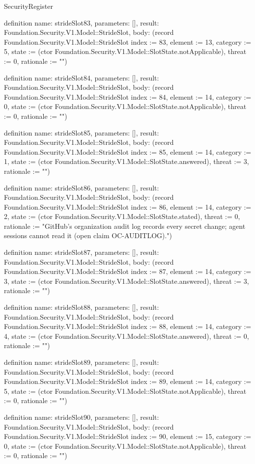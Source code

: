 \begin{lexlean}{SecurityRegister}
\begin{semanticmodule}
definition{
  name: strideSlot83,
  parameters: [],
  result: Foundation.Security.V1.Model::StrideSlot,
  body: (record Foundation.Security.V1.Model::StrideSlot {index := 83, element := 13, category := 5, state := (ctor Foundation.Security.V1.Model::SlotState.notApplicable), threat := 0, rationale := ""})
}

definition{
  name: strideSlot84,
  parameters: [],
  result: Foundation.Security.V1.Model::StrideSlot,
  body: (record Foundation.Security.V1.Model::StrideSlot {index := 84, element := 14, category := 0, state := (ctor Foundation.Security.V1.Model::SlotState.notApplicable), threat := 0, rationale := ""})
}

definition{
  name: strideSlot85,
  parameters: [],
  result: Foundation.Security.V1.Model::StrideSlot,
  body: (record Foundation.Security.V1.Model::StrideSlot {index := 85, element := 14, category := 1, state := (ctor Foundation.Security.V1.Model::SlotState.answered), threat := 3, rationale := ""})
}

definition{
  name: strideSlot86,
  parameters: [],
  result: Foundation.Security.V1.Model::StrideSlot,
  body: (record Foundation.Security.V1.Model::StrideSlot {index := 86, element := 14, category := 2, state := (ctor Foundation.Security.V1.Model::SlotState.stated), threat := 0, rationale := "GitHub's organization audit log records every secret change; agent sessions cannot read it (open claim OC-AUDITLOG)."})
}

definition{
  name: strideSlot87,
  parameters: [],
  result: Foundation.Security.V1.Model::StrideSlot,
  body: (record Foundation.Security.V1.Model::StrideSlot {index := 87, element := 14, category := 3, state := (ctor Foundation.Security.V1.Model::SlotState.answered), threat := 3, rationale := ""})
}

definition{
  name: strideSlot88,
  parameters: [],
  result: Foundation.Security.V1.Model::StrideSlot,
  body: (record Foundation.Security.V1.Model::StrideSlot {index := 88, element := 14, category := 4, state := (ctor Foundation.Security.V1.Model::SlotState.answered), threat := 0, rationale := ""})
}

definition{
  name: strideSlot89,
  parameters: [],
  result: Foundation.Security.V1.Model::StrideSlot,
  body: (record Foundation.Security.V1.Model::StrideSlot {index := 89, element := 14, category := 5, state := (ctor Foundation.Security.V1.Model::SlotState.notApplicable), threat := 0, rationale := ""})
}

definition{
  name: strideSlot90,
  parameters: [],
  result: Foundation.Security.V1.Model::StrideSlot,
  body: (record Foundation.Security.V1.Model::StrideSlot {index := 90, element := 15, category := 0, state := (ctor Foundation.Security.V1.Model::SlotState.notApplicable), threat := 0, rationale := ""})
}


\end{semanticmodule}
\end{lexlean}
